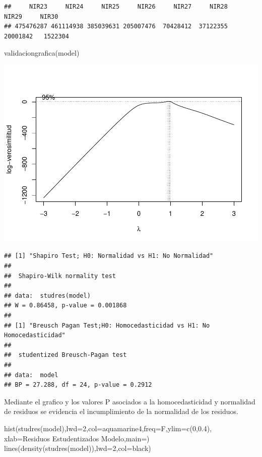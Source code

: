 \documentclass[
]{article}
\newenvironment{Shaded}{\begin{snugshade}}{\end{snugshade}}
\newcommand{\AttributeTok}[1]{\textcolor[rgb]{0.77,0.63,0.00}{#1}}
\newcommand{\DecValTok}[1]{\textcolor[rgb]{0.00,0.00,0.81}{#1}}
\newcommand{\FloatTok}[1]{\textcolor[rgb]{0.00,0.00,0.81}{#1}}
\newcommand{\FunctionTok}[1]{\textcolor[rgb]{0.00,0.00,0.00}{#1}}
\newcommand{\NormalTok}[1]{#1}
\newcommand{\StringTok}[1]{\textcolor[rgb]{0.31,0.60,0.02}{#1}}
\begin{document}
\begin{verbatim}
##     NIR23     NIR24     NIR25     NIR26     NIR27     NIR28     NIR29     NIR30 
## 475476287 461114938 385039631 205007476  70428412  37122355  20001842   1522304
\end{verbatim}

\begin{Shaded}
\begin{Highlighting}[]
\FunctionTok{validaciongrafica}\NormalTok{(model)}
\end{Highlighting}
\end{Shaded}

\includegraphics{Taller-2-Regresion-Multiple-Aplicada_files/figure-latex/unnamed-chunk-5-1.pdf}

\begin{verbatim}
## [1] "Shapiro Test; H0: Normalidad vs H1: No Normalidad"
## 
##  Shapiro-Wilk normality test
## 
## data:  studres(model)
## W = 0.86458, p-value = 0.001868
## 
## [1] "Breusch Pagan Test;H0: Homocedasticidad vs H1: No Homocedasticidad"
## 
##  studentized Breusch-Pagan test
## 
## data:  model
## BP = 27.288, df = 24, p-value = 0.2912
\end{verbatim}

Mediante el grafico y los valores P asociados a la homocedasticidad y
normalidad de residuos se evidencia el incumplimiento de la normalidad
de los residuos.

\begin{Shaded}
\begin{Highlighting}[]
\FunctionTok{hist}\NormalTok{(}\FunctionTok{studres}\NormalTok{(model),}\AttributeTok{lwd=}\DecValTok{2}\NormalTok{,}\AttributeTok{col=}\StringTok{\textquotesingle{}aquamarine4\textquotesingle{}}\NormalTok{,}\AttributeTok{freq=}\NormalTok{F,}\AttributeTok{ylim=}\FunctionTok{c}\NormalTok{(}\DecValTok{0}\NormalTok{,}\FloatTok{0.4}\NormalTok{),}
     \AttributeTok{xlab=}\StringTok{\textquotesingle{}Residuos Estudentizados Modelo\textquotesingle{}}\NormalTok{,}\AttributeTok{main=}\StringTok{\textquotesingle{}\textquotesingle{}}\NormalTok{)}
\FunctionTok{lines}\NormalTok{(}\FunctionTok{density}\NormalTok{(}\FunctionTok{studres}\NormalTok{(model)),}\AttributeTok{lwd=}\DecValTok{2}\NormalTok{,}\AttributeTok{col=}\StringTok{\textquotesingle{}black\textquotesingle{}}\NormalTok{)}
\end{Highlighting}
\end{Shaded}
\end{document}
